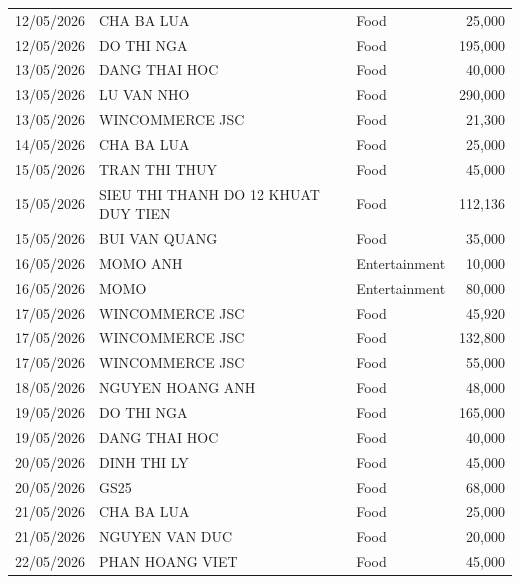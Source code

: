 {\begin{longtable}{lp{6.2cm}lr}
12/05/2026 & CHA BA LUA                            & Food            &  25,000 \\
12/05/2026 & DO THI NGA                            & Food            & 195,000 \\
13/05/2026 & DANG THAI HOC                         & Food            &  40,000 \\
13/05/2026 & LU VAN NHO                            & Food            & 290,000 \\
13/05/2026 & WINCOMMERCE JSC                       & Food            &  21,300 \\
14/05/2026 & CHA BA LUA                            & Food            &  25,000 \\
15/05/2026 & TRAN THI THUY                         & Food            &  45,000 \\
15/05/2026 & SIEU THI THANH DO 12 KHUAT DUY TIEN   & Food            & 112,136 \\
15/05/2026 & BUI VAN QUANG                         & Food            &  35,000 \\
16/05/2026 & MOMO ANH                              & Entertainment   &  10,000 \\
16/05/2026 & MOMO                                  & Entertainment   &  80,000 \\
17/05/2026 & WINCOMMERCE JSC                       & Food            &  45,920 \\
17/05/2026 & WINCOMMERCE JSC                       & Food            & 132,800 \\
17/05/2026 & WINCOMMERCE JSC                       & Food            &  55,000 \\
18/05/2026 & NGUYEN HOANG ANH                      & Food            &  48,000 \\
19/05/2026 & DO THI NGA                            & Food            & 165,000 \\
19/05/2026 & DANG THAI HOC                         & Food            &  40,000 \\
20/05/2026 & DINH THI LY                           & Food            &  45,000 \\
20/05/2026 & GS25                                  & Food            &  68,000 \\
21/05/2026 & CHA BA LUA                            & Food            &  25,000 \\
21/05/2026 & NGUYEN VAN DUC                        & Food            &  20,000 \\
22/05/2026 & PHAN HOANG VIET                       & Food            &  45,000 \\

\end{longtable}}
